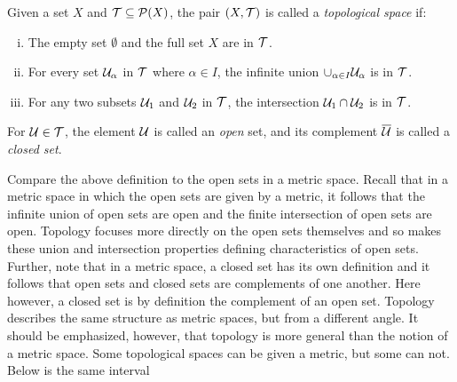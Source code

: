 \documentclass[../sean_thesis.tex]{subfiles}
\begin{document}
\begin{definition}
    Given a set $X$ and $\mathcal{T} \subseteq \mathcal{P} (X)$, the pair $(X,\mathcal{T})$ is called a \emph{topological space} if:
    \vspace{-\varparskip}
    \begin{enumerate}[(i)]
        \item The empty set $\emptyset$ and the full set $X$ are in $\mathcal{T}$.
        \item For every set $\mathcal{U}_\alpha$ in $\mathcal{T}$ where $\alpha \in I$, the infinite union $\cup_{\alpha\in I} \mathcal{U}_\alpha$ is in $\mathcal{T}$.
        \item For any two subsets $\mathcal{U}_1$ and $\mathcal{U}_2$ in $\mathcal{T}$, the intersection $\mathcal{U}_1 \cap \mathcal{U}_2$ is in $\mathcal{T}$.
    \end{enumerate}
     \vspace{-\varparskip}
    For $\mathcal{U} \in \mathcal{T}$, the element $\mathcal{U}$ is called an \emph{open} set, and its complement $\overline{\mathcal{U}}$ is called a \emph{closed set}.
\end{definition}

Compare the above definition to the open sets in a metric space. Recall that in a metric space in which the open sets are given by a metric, it follows that the infinite union of open sets are open and the finite intersection of open sets are open. Topology focuses more directly on the open sets themselves and so makes these union and intersection properties defining characteristics of open sets. Further, note that in a metric space, a closed set has its own definition and it follows that open sets and closed sets are complements of one another. Here however, a closed set is by definition the complement of an open set. Topology describes the same structure as metric spaces, but from a different angle. It should be emphasized, however, that topology is more general than the notion of a metric space. Some topological spaces can be given a metric, but some can not. Below is the same interval
\end{document}
